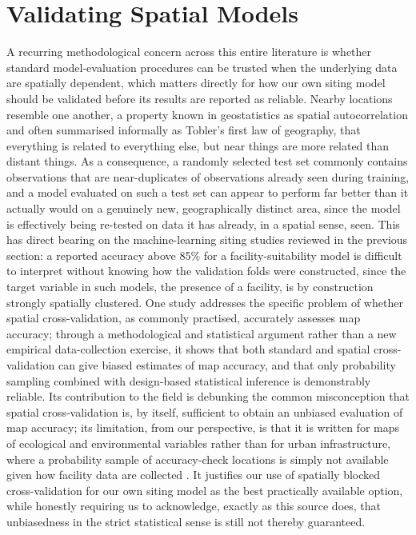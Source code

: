 \documentclass[journal]{IEEEtran}
\begin{document}
\section{Validating Spatial Models}
\label{sec:validation}

A recurring methodological concern across this entire literature is whether standard model-evaluation procedures can be trusted when the underlying data are spatially dependent, which matters directly for how our own siting model should be validated before its results are reported as reliable. Nearby locations resemble one another, a property known in geostatistics as spatial autocorrelation and often summarised informally as Tobler's first law of geography, that everything is related to everything else, but near things are more related than distant things. As a consequence, a randomly selected test set commonly contains observations that are near-duplicates of observations already seen during training, and a model evaluated on such a test set can appear to perform far better than it actually would on a genuinely new, geographically distinct area, since the model is effectively being re-tested on data it has already, in a spatial sense, seen. This has direct bearing on the machine-learning siting studies reviewed in the previous section: a reported accuracy above 85\% for a facility-suitability model is difficult to interpret without knowing how the validation folds were constructed, since the target variable in such models, the presence of a facility, is by construction strongly spatially clustered. One study addresses the specific problem of whether spatial cross-validation, as commonly practised, accurately assesses map accuracy; through a methodological and statistical argument rather than a new empirical data-collection exercise, it shows that both standard and spatial cross-validation can give biased estimates of map accuracy, and that only probability sampling combined with design-based statistical inference is demonstrably reliable. Its contribution to the field is debunking the common misconception that spatial cross-validation is, by itself, sufficient to obtain an unbiased evaluation of map accuracy; its limitation, from our perspective, is that it is written for maps of ecological and environmental variables rather than for urban infrastructure, where a probability sample of accuracy-check locations is simply not available given how facility data are collected \cite{wadoux2021spatial}. It justifies our use of spatially blocked cross-validation for our own siting model as the best practically available option, while honestly requiring us to acknowledge, exactly as this source does, that unbiasedness in the strict statistical sense is still not thereby guaranteed.
\end{document}
